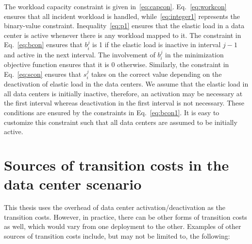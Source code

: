 The workload capacity constraint is given in~\eqref{eq:capcon}. Eq.~\eqref{eq:workcon} ensures that all incident workload is handled, while~\eqref{eq:integer1} represents the binary-value
constraint. Inequality~\eqref{eq:p1} ensures that the elastic load in a data center
is active whenever there is any workload mapped to it. The constraint in Eq.~\eqref{eq:bcon} ensures that $b_i^j$ is 1 if the elastic load is inactive in interval $j-1$ and active in the next interval. The involvement of $b_i^j$ in the minimization objective function ensures that it is 0 otherwise. Similarly, the constraint in Eq.~\eqref{eq:scon} ensures that $s_i^j$ takes on the correct value depending on the deactivation of elastic load in the data centers. We assume that the elastic load in all data centers is initially inactive, therefore, an activation may be necessary at the first interval whereas deactivation in the first interval is not necessary. These conditions are ensured by the constraints in Eq.~\eqref{eq:bcon1}. It is easy to customize this constraint such that all data centers are assumed to be initially active.

\section{Sources of transition costs in the data center scenario}
This thesis uses the overhead of data center activation/deactivation as the transition costs. However, in practice, there can be other forms
of transition costs as well, which would vary from one deployment to the other. Examples of other sources of transition costs include, but may not be limited to, the following:


